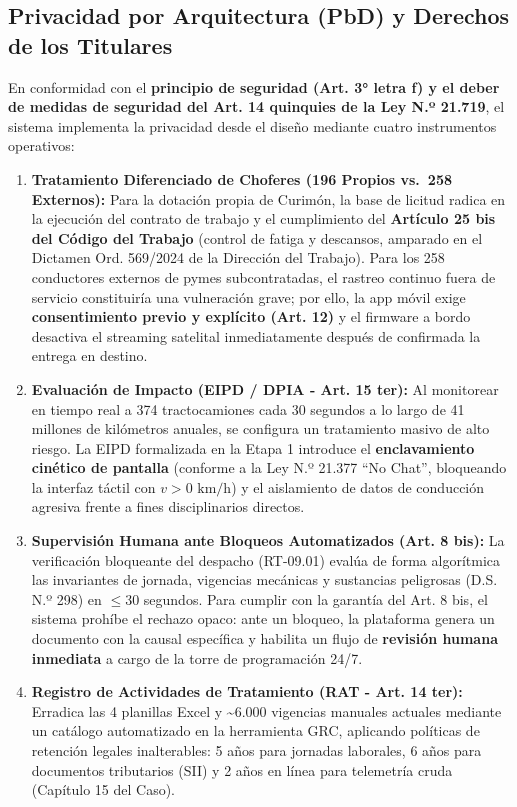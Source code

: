 \subsection{Privacidad por Arquitectura (PbD) y Derechos de los Titulares}\label{privacidad-por-arquitectura-pbd-y-derechos-de-los-titulares}

En conformidad con el \textbf{principio de seguridad (Art. 3° letra f) y el deber de medidas de seguridad del Art. 14 quinquies de la Ley N.º 21.719}, el sistema implementa la privacidad desde el diseño mediante cuatro instrumentos operativos:

\begin{enumerate}
\def\labelenumi{\arabic{enumi}.}
\tightlist
\item
  \textbf{Tratamiento Diferenciado de Choferes (196 Propios vs.~258 Externos):} Para la dotación propia de Curimón, la base de licitud radica en la ejecución del contrato de trabajo y el cumplimiento del \textbf{Artículo 25 bis del Código del Trabajo} (control de fatiga y descansos, amparado en el Dictamen Ord. 569/2024 de la Dirección del Trabajo). Para los 258 conductores externos de pymes subcontratadas, el rastreo continuo fuera de servicio constituiría una vulneración grave; por ello, la app móvil exige \textbf{consentimiento previo y explícito (Art. 12)} y el firmware a bordo desactiva el streaming satelital inmediatamente después de confirmada la entrega en destino.
\item
  \textbf{Evaluación de Impacto (EIPD / DPIA - Art. 15 ter):} Al monitorear en tiempo real a 374 tractocamiones cada 30 segundos a lo largo de 41 millones de kilómetros anuales, se configura un tratamiento masivo de alto riesgo. La EIPD formalizada en la Etapa 1 introduce el \textbf{enclavamiento cinético de pantalla} (conforme a la Ley N.º 21.377 ``No Chat'', bloqueando la interfaz táctil con \(v > 0\text{ km/h}\)) y el aislamiento de datos de conducción agresiva frente a fines disciplinarios directos.
\item
  \textbf{Supervisión Humana ante Bloqueos Automatizados (Art. 8 bis):} La verificación bloqueante del despacho (RT-09.01) evalúa de forma algorítmica las invariantes de jornada, vigencias mecánicas y sustancias peligrosas (D.S. N.º 298) en \(\le 30\) segundos. Para cumplir con la garantía del Art. 8 bis, el sistema prohíbe el rechazo opaco: ante un bloqueo, la plataforma genera un documento con la causal específica y habilita un flujo de \textbf{revisión humana inmediata} a cargo de la torre de programación 24/7.
\item
  \textbf{Registro de Actividades de Tratamiento (RAT - Art. 14 ter):} Erradica las 4 planillas Excel y \textasciitilde6.000 vigencias manuales actuales mediante un catálogo automatizado en la herramienta GRC, aplicando políticas de retención legales inalterables: 5 años para jornadas laborales, 6 años para documentos tributarios (SII) y 2 años en línea para telemetría cruda (Capítulo 15 del Caso).
\end{enumerate}

